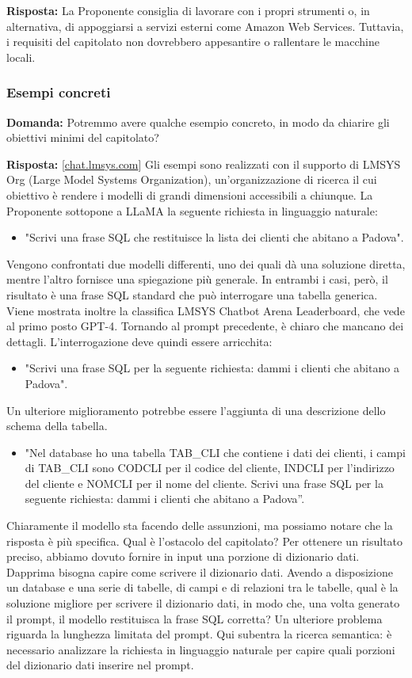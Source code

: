 \textbf{Risposta:} La Proponente consiglia di lavorare con i propri strumenti o, in alternativa, di appoggiarsi a servizi esterni come Amazon Web Services. Tuttavia, i requisiti del capitolato non dovrebbero appesantire o rallentare le macchine locali.

\subsubsection{Esempi concreti}
\textbf{Domanda:} Potremmo avere qualche esempio concreto, in modo da chiarire gli obiettivi minimi del capitolato?

\textbf{Risposta:} [\href{https://chat.lmsys.com}{chat.lmsys.com}] Gli esempi sono realizzati con il supporto di LMSYS Org (Large Model Systems Organization), un'organizzazione di ricerca il cui obiettivo è rendere i modelli di grandi dimensioni accessibili a chiunque. La Proponente sottopone a LLaMA la seguente richiesta in linguaggio naturale:
	\begin{itemize}
		\item "Scrivi una frase SQL che restituisce la lista dei clienti che abitano a Padova".
	\end{itemize}
	Vengono confrontati due modelli differenti, uno dei quali dà una soluzione diretta, mentre l’altro fornisce una spiegazione più generale. In entrambi i casi, però, il risultato è una frase SQL standard che può interrogare una tabella generica. Viene mostrata inoltre la classifica LMSYS Chatbot Arena Leaderboard, che vede al primo posto GPT-4. Tornando al prompt precedente, è chiaro che mancano dei dettagli. L’interrogazione deve quindi essere arricchita:
	\begin{itemize}
		\item "Scrivi una frase SQL per la seguente richiesta: dammi i clienti che abitano a Padova".
	\end{itemize}
	Un ulteriore miglioramento potrebbe essere l’aggiunta di una descrizione dello schema della tabella.
	\begin{itemize}
		\item "Nel database ho una tabella TAB\_CLI che contiene i dati dei clienti, i campi di TAB\_CLI sono CODCLI per il codice del cliente, INDCLI per l'indirizzo del cliente e NOMCLI per il nome del cliente. Scrivi una frase SQL per la seguente richiesta: dammi i clienti che abitano a Padova”.
	\end{itemize}
	Chiaramente il modello sta facendo delle assunzioni, ma possiamo notare che la risposta è più specifica. Qual è l’ostacolo del capitolato? Per ottenere un risultato preciso, abbiamo dovuto fornire in input una porzione di dizionario dati. Dapprima bisogna capire come scrivere il dizionario dati. Avendo a disposizione un database e una serie di tabelle, di campi e di relazioni tra le tabelle, qual è la soluzione migliore per scrivere il dizionario dati, in modo che, una volta generato il prompt, il modello restituisca la frase SQL corretta? Un ulteriore problema riguarda la lunghezza limitata del prompt. Qui subentra la ricerca semantica: è necessario analizzare la richiesta in linguaggio naturale per capire quali porzioni del dizionario dati inserire nel prompt.

